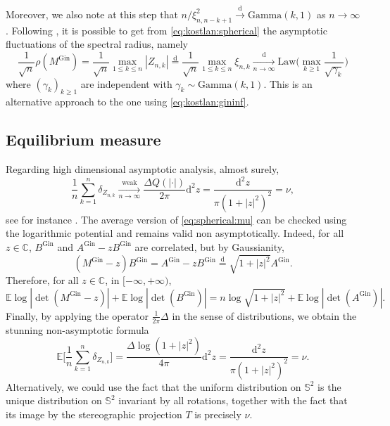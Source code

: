 \documentclass[10pt,reqno]{amsart}
\newcommand{\dd}{\mathrm{d}}
\newcommand{\<}{\langle}
\renewcommand{\>}{\rangle}
\newcommand{\AG}{A^{\mathrm{Gin}}}
\newcommand{\BG}{B^{\mathrm{Gin}}}
\newcommand{\MG}{M^{\mathrm{Gin}}}
\numberwithin{equation}{section}
\begin{document}
Moreover, we also note at this step that
$n/\xi_{n,n-k+1}^2\overset{\mathrm{d}}{\to}\mathrm{Gamma}(k,1)$ as $n\to\infty$.
Following \cite{MR3215627,MR3615091}, it is possible to get
 from \eqref{eq:kostlan:spherical} the asymptotic fluctuations of the
 spectral radius, namely
\begin{equation}\label{eq:spherical:rho}
    \frac{1}{\sqrt{n}}\rho(\MG)
    =\frac{1}{\sqrt{n}}\max_{1\leq k\leq n}|Z_{n,k}|
    \overset{\mathrm{d}}{=}
    \frac{1}{\sqrt{n}}\max_{1\leq k\leq n}\xi_{n,k}
    \xrightarrow[n\to\infty]{\mathrm{d}}
    \mathrm{Law}\Bigr(\max_{k\geq1}\frac{1}{\sqrt{\gamma_k}}\Bigr)
\end{equation}
where ${(\gamma_k)}_{k\geq1}$ are independent with $\gamma_k\sim\mathrm{Gamma}(k,1)$.
This is an alternative approach to the one using \eqref{eq:kostlan:gininf}. 


\subsection{Equilibrium measure}

Regarding high dimensional asymptotic analysis, almost surely,
\begin{equation}\label{eq:spherical:mu}
\frac{1}{n}\sum_{k=1}^n\delta_{Z_{n,k}}
\xrightarrow[n\to\infty]{\text{weak}}
\frac{\Delta Q(\left|\cdot\right|)}{2\pi}\dd^2z
=\frac{\dd^2z}{\pi(1+|z|^2)^2}
=\nu,
\end{equation}
see for instance \cite{MR2926763}. The average version of \eqref{eq:spherical:mu} can be checked using the logarithmic potential and remains valid non asymptotically. Indeed, for all $z\in\mathbb{C}$,
$\BG$ and $\AG-z\BG$ are correlated, but by Gaussianity,
\begin{equation}
(\MG-z)\BG
=\AG-z\BG
\overset{\dd}{=}
\sqrt{1+|z|^2}\AG.
\end{equation}
Therefore, for all $z\in\mathbb{C}$, in $[-\infty,+\infty)$,
\begin{equation}\label{eq:E:logdet:spherical}
\mathbb{E}\log|\det(\MG-z)|+\mathbb{E}\log|\det(\BG)|
=n\log\sqrt{1+|z|^2}+\mathbb{E}\log|\det(\AG)|.
\end{equation}
Finally, by applying the operator $\frac{1}{2\pi}\Delta$ in the sense of distributions, we obtain the stunning non-asymptotic formula
\begin{equation}\label{eq:EESD:spherical}
\mathbb{E}\Bigg[ \frac{1}{n}\sum_{k=1}^n\delta_{Z_{n,k}} \Bigg] =\frac{\Delta\log(1+|z|^2)}{4\pi}\dd^2z=\frac{\dd^2z}{\pi(1+|z|^2)^2}=\nu.
\end{equation}
Alternatively, we could use the fact that the uniform distribution on
$\mathbb{S}^2$ is the unique distribution on $\mathbb{S}^2$ invariant by all
rotations, together with the fact that its image by the stereographic
projection $T$ is precisely $\nu$.
\end{document}
